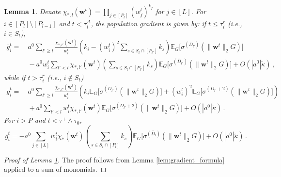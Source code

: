 \documentclass[11pt]{article}
\newcommand{\E}{\mathbb{E}}
\newcommand{\<}{\langle}
\renewcommand{\>}{\rangle}
\newtheorem{lemma}{Lemma}
\theoremstyle{definition}
\def\bw{{\boldsymbol w}}
\def\bw{{\boldsymbol w}}
\def\og{\overline{g}}
\def\oD{\overline{D}}
\def\oD{\overline{D}}
\begin{document}
\begin{lemma}\label{lem:gradient_formula_multi} Denote $\chi_{*,l} (\bw^t) = \prod_{j \in [P_l]} (w_j^t )^{k_j} $ for $j \in [L]$. For $i \in [P_l] \setminus [P_{l-1}]$ and $t < \tau_i^\Delta$, the population gradient is given by: if $t \leq \tau_i^r$ (i.e., $i \in S_t$),
\begin{equation}\label{eq:grad_formula_multiP_St}
\begin{aligned}
\og_i^t =&~ a^0 \sum_{l' \geq l} \frac{\chi_{*,l'} (\bw^t)}{w_i^t} \left( k_i - (w_i^t)^2 \sum_{s \in S_t \cap [P_{l'}]} k_s \right) \E_{G} \Big[ \sigma^{(\oD_{l'})} (\| \bw^t \|_2 G ) \Big] \\
&~ - a^0 w_i^t \sum_{l' < l} \chi_{*,l'} (\bw^t) \left( \sum_{s \in S_t \cap [P_{l'}]} k_s \right)\E_{G} \Big[ \sigma^{(\oD_{l'})} (\| \bw^t \|_2 G ) \Big] + O(|a^0|\tilde{\kappa})\, ,
\end{aligned}
\end{equation}
while if $t > \tau_i^r$ (i.e., $i \not\in S_t$)
\begin{equation}\label{eq:grad_formula_multiP_notSt}
\begin{aligned}
\og_i^t =&~  a^0 \sum_{l' \geq l} \frac{\chi_{*,l'} (\bw^t)}{w_i^t} \left( k_i  \E_{G} \Big[ \sigma^{(\oD_{l'})} (\| \bw^t \|_2 G ) \Big] + (w_i^t)^2 \E_{G} \Big[ \sigma^{(\oD_{l'}+2)} (\| \bw^t \|_2 G ) \Big] \right) \\
&~ + a^0 \sum_{l' < l} w_i^t \chi_{*,l'} (\bw^t) \E_{G} \Big[ \sigma^{(\oD_{l'}+2)} (\| \bw^t \|_2 G ) \Big] + O(|a^0|\tilde{\kappa}) \, .
\end{aligned}
\end{equation}
For $i > P$ and $t < \tau^+ \wedge \tau_0$,
\begin{equation}\label{eq:grad_formula_notmultiP}
\og_i^t = -a^0  \sum_{j \in [L]} w_i^t \chi_* (\bw^t) \left( \sum_{s \in S_t \cap [P_{l}]} k_s \right)\E_{G} \Big[ \sigma^{(\oD_{l})} (\| \bw^t \|_2 G ) \Big] + O(|a^0|\tilde{\kappa}) \, .
\end{equation}
\end{lemma}

\begin{proof}[Proof of Lemma \ref{lem:gradient_formula_multi}]
    The proof follows from Lemma \ref{lem:gradient_formula} applied to a sum of monomials.
\end{proof}
\end{document}
